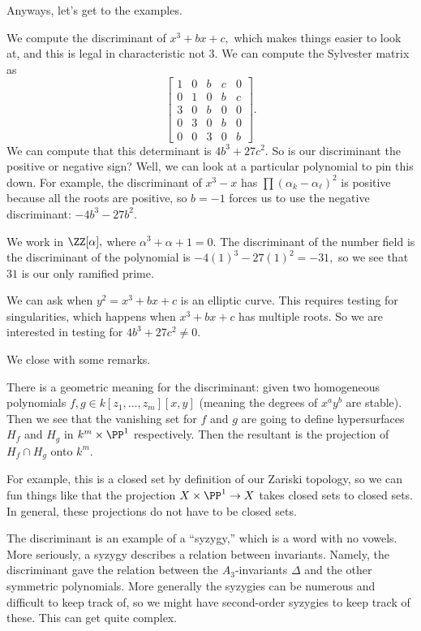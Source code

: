 Anyways, let's get to the examples.
\begin{example}
	We compute the discriminant of $x^3+bx+c,$ which makes things easier to look at, and this is legal in characteristic not $3.$ We can compute the Sylvester matrix as
	\[\begin{bmatrix}
		1 & 0 & b & c & 0 \\
		0 & 1 & 0 & b & c \\
		3 & 0 & b & 0 & 0 \\
		0 & 3 & 0 & b & 0 \\
		0 & 0 & 3 & 0 & b
	\end{bmatrix}.\]
	We can compute that this determinant is $4b^3+27c^2.$ So is our discriminant the positive or negative sign? Well, we can look at a particular polynomial to pin this down. For example, the discriminant of $x^3-x$ has $\prod(\alpha_k-\alpha_\ell)^2$ is positive because all the roots are positive, so $b=-1$ forces us to use the negative discriminant: $\boxed{-4b^3-27b^2}.$
\end{example}
\begin{example}
	We work in $\ZZ[\alpha],$ where $\alpha^3+\alpha+1=0.$ The discriminant of the number field is the discriminant of the polynomial is $-4(1)^3-27(1)^2=-31,$ so we see that $31$ is our only ramified prime.
\end{example}
\begin{example}
	We can ask when $y^2=x^3+bx+c$ is an elliptic curve. This requires testing for singularities, which happens when $x^3+bx+c$ has multiple roots. So we are interested in testing for $4b^3+27c^2\ne0.$
\end{example}
We close with some remarks.
\begin{remark}
	There is a geometric meaning for the discriminant: given two homogeneous polynomials $f,g\in k[z_1,\ldots,z_m][x,y]$ (meaning the degrees of $x^ay^b$ are stable). Then we see that the vanishing set for $f$ and $g$ are going to define hypersurfaces $H_f$ and $H_g$ in $k^m\times\PP^1$ respectively. Then the resultant is the projection of $H_f\cap H_g$ onto $k^m.$
	
	For example, this is a closed set by definition of our Zariski topology, so we can fun things like that the projection $X\times\PP^1\to X$ takes closed sets to closed sets. In general, these projections do not have to be closed sets.
\end{remark}
The discriminant is an example of a ``syzygy,'' which is a word with no vowels. More seriously, a syzygy describes a relation between invariants. Namely, the discriminant gave the relation between the $A_3$-invariants $\Delta$ and the other symmetric polynomials. More generally the syzygies can be numerous and difficult to keep track of, so we might have second-order syzygies to keep track of these. This can get quite complex.
